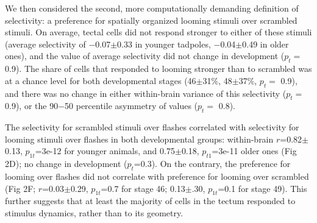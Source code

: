 \documentclass{article}
\begin{document}



We then considered the second, more computationally demanding definition of selectivity: a preference for spatially organized looming stimuli over scrambled stimuli. On average, tectal cells did not respond stronger to either of these stimuli (average selectivity of $-$0.07$\pm$0.33 in younger tadpoles, $-$0.04$\pm$0.49 in older ones), and the value of average selectivity did not change in development ($p_t=$ 0.9). The share of cells that responded to looming stronger than to scrambled was at a chance level for both developmental stages (46$\pm$31\%, 48$\pm$37\%, $p_t=$ 0.9), and there was no change in either within-brain variance of this selectivity ($p_t=$ 0.9), or the 90$-$50 percentile asymmetry of values ($p_t=$ 0.8).

The selectivity for scrambled stimuli over flashes correlated with selectivity for looming stimuli over flashes in both developmental groups: within-brain $r$=0.82$\pm$0.13, $p_{1t}$=3e-12 for younger animals, and 0.75$\pm$0.18, $p_{t1}$=3e-11 older ones (Fig 2D); no change in development ($p_t$=0.3). On the contrary, the preference for looming over flashes did not correlate with preference for looming over scrambled (Fig 2F; $r$=0.03$\pm$0.29, $p_{1t}$=0.7 for stage 46; 0.13$\pm$.30, $p_{1t}$=0.1 for stage 49). This further suggests that at least the majority of cells in the tectum responded to stimulus dynamics, rather than to its geometry.
\end{document}
